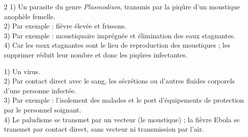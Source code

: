 \begin{multicols}{2}
1) Un parasite du genre \textit{Plasmodium}, transmis par la piqûre d'un moustique
anophèle femelle.\\
2) Par exemple : fièvre élevée et frissons.\\
3) Par exemple : moustiquaire imprégnée et élimination des eaux stagnantes.\\
4) Car les eaux stagnantes sont le lieu de reproduction des moustiques ; les
supprimer réduit leur nombre et donc les piqûres infectantes.

1) Un virus.\\
2) Par contact direct avec le sang, les sécrétions ou d'autres fluides corporels
d'une personne infectée.\\
3) Par exemple : l'isolement des malades et le port d'équipements de protection par
le personnel soignant.\\
4) Le paludisme se transmet par un vecteur (le moustique) ; la fièvre Ebola se
transmet par contact direct, sans vecteur ni transmission par l'air.

\end{multicols}
\exercicesBanner
